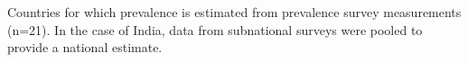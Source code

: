 \label{fig:ps}Countries for which prevalence is estimated from prevalence survey measurements (n=21). In the case of India, data from subnational surveys were pooled to provide a national estimate.